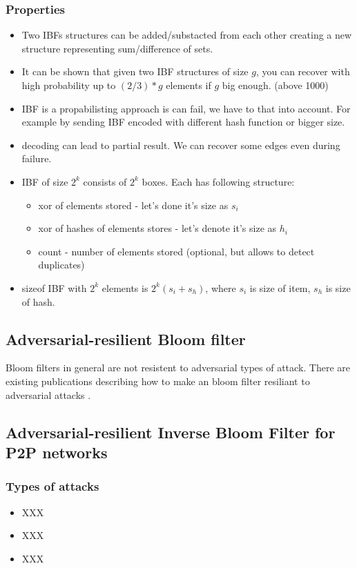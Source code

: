 \documentclass[11pt]{article}
\begin{document}
\subsubsection{Properties}
\begin{itemize}
\item Two IBFs structures can be added/substacted from each other creating a new structure representing sum/difference of sets.
\item It can be shown that given two IBF structures of size $g$, you can recover with high probability up to $(2/3)*g$ elements if $g$ big enough. (above 1000)  \cite{esrwpc}
\item IBF is a propabilisting approach is can fail, we have to that into account. For example by sending IBF encoded with different hash function or bigger size.
\item decoding can lead to partial result. We can recover some edges even during failure.
\item IBF of size $2^k$ consists of $2^k$ boxes. Each has following structure:
\begin{itemize}
\item xor of elements stored -  let's done it's size as $s_i$
\item xor of hashes of elements stores - let's denote it's size as $h_i$
\item count - number of elements stored (optional, but allows to detect duplicates)
\end{itemize}
\item sizeof IBF with $2^k$ elements is $2^k(s_i + s_h)$, where $s_i$ is size of item, $s_h$ is size of hash.
\end{itemize}


\subsection{Adversarial-resilient Bloom filter}
Bloom filters in general are not resistent to adversarial types of attack.
There are existing publications describing how to make an bloom filter resiliant to adversarial attacks \cite{adversarial}.

\subsection{Adversarial-resilient Inverse Bloom Filter for P2P networks}
\subsubsection{Types of attacks}
\begin{itemize}
\item XXX
\item XXX
\item XXX
\end{itemize}
\end{document}

